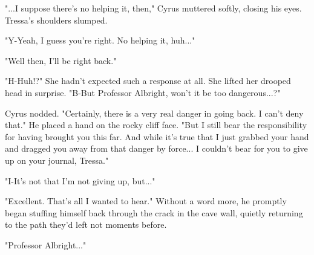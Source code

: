 "...I suppose there's no helping it, then," Cyrus muttered softly, closing his eyes. Tressa's shoulders slumped.

"Y-Yeah, I guess you're right. No helping it, huh..."

"Well then, I'll be right back."

"H-Huh!?" She hadn't expected such a response at all. She lifted her drooped head in surprise. "B-But Professor Albright, won't it be too dangerous...?"

Cyrus nodded. "Certainly, there is a very real danger in going back. I can't deny that." He placed a hand on the rocky cliff face. "But I still bear the responsibility for having brought you this far. And while it's true that I just grabbed your hand and dragged you away from that danger by force... I couldn't bear for you to give up on your journal, Tressa."

"I-It's not that I'm not giving up, but..."

"Excellent. That's all I wanted to hear." Without a word more, he promptly began stuffing himself back through the crack in the cave wall, quietly returning to the path they'd left not moments before.

"Professor Albright..."
